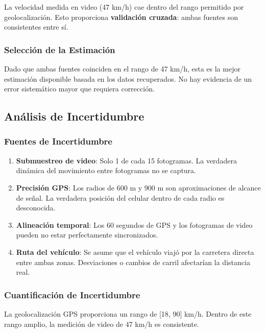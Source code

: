 \documentclass[12pt]{article}
\begin{document}
La velocidad medida en video (47 km/h) cae dentro del rango permitido por geolocalización. Esto proporciona \textbf{validación cruzada}: ambas fuentes son consistentes entre sí.

\subsubsection*{Selección de la Estimación}

Dado que ambas fuentes coinciden en el rango de 47 km/h, esta es la mejor estimación disponible basada en los datos recuperados. No hay evidencia de un error sistemático mayor que requiera corrección.

\subsection*{Análisis de Incertidumbre}

\subsubsection*{Fuentes de Incertidumbre}

\begin{enumerate}
    \item \textbf{Submuestreo de video}: Solo 1 de cada 15 fotogramas. La verdadera dinámica del movimiento entre fotogramas no se captura.
    
    \item \textbf{Precisión GPS}: Los radios de 600 m y 900 m son aproximaciones de alcance de señal. La verdadera posición del celular dentro de cada radio es desconocida.
    
    \item \textbf{Alineación temporal}: Los 60 segundos de GPS y los fotogramas de video pueden no estar perfectamente sincronizados.
    
    \item \textbf{Ruta del vehículo}: Se asume que el vehículo viajó por la carretera directa entre ambas zonas. Desviaciones o cambios de carril afectarían la distancia real.
\end{enumerate}

\subsubsection*{Cuantificación de Incertidumbre}

La geolocalización GPS proporciona un rango de [18, 90] km/h. Dentro de este rango amplio, la medición de video de 47 km/h es consistente.
\end{document}
